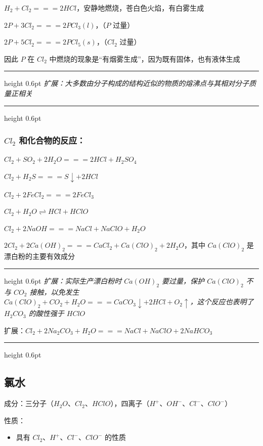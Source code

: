 \documentclass[UTF8,zihao=-4,openany]{ctexbook}
\newenvironment{notebox}
  {\par\smallskip\noindent\begingroup\begin{minipage}{\linewidth}\color{noteframe}\hrule height 0.6pt\smallskip\color{black}\itshape}
  {\par\smallskip\color{noteframe}\hrule height 0.6pt\end{minipage}\endgroup\par\smallskip}
\begin{document}
$H_2+Cl_2=\!=\!=2HCl$，安静地燃烧，苍白色火焰，有白雾生成\par

$2P+3Cl_2=\!=\!=2PCl_3(l)$，（$P$ 过量）\par

$2P+5Cl_2=\!=\!=2PCl_5(s)$，（$Cl_2$ 过量）\par

因此 $P$ 在 $Cl_2$ 中燃烧的现象是“有烟雾生成”，因为既有固体，也有液体生成\par
\begin{notebox}
扩展：大多数由分子构成的结构近似的物质的熔沸点与其相对分子质量正相关\par
\end{notebox}
\subsubsection{$Cl_2$ 和化合物的反应：}
$Cl_2+SO_2+2H_2O=\!=\!=2HCl+H_2SO_4$\par

$Cl_2+H_2S=\!=\!=S\downarrow+2HCl$\par

$Cl_2+2FeCl_2=\!=\!=2FeCl_3$\par

$Cl_2+H_2O\rightleftharpoons HCl+HClO$\par

$Cl_2+2NaOH=\!=\!=NaCl+NaClO+H_2O$\par

$2Cl_2+2Ca(OH)_2=\!=\!=CaCl_2+Ca(ClO)_2+2H_2O$，其中 $Ca(ClO)_2$ 是漂白粉的主要有效成分\par
\begin{notebox}
扩展：实际生产漂白粉时 $Ca(OH)_2$ 要过量，保护 $Ca(ClO)_2$ 不与 $CO_2$ 接触，以免发生 $Ca(ClO)_2+CO_2+H_2O=\!=\!=CaCO_3\downarrow +2HCl+O_2\uparrow$，这个反应也表明了 $H_2CO_3$ 的酸性强于 $HClO$\par
扩展：$Cl_2+2Na_2CO_3+H_2O=\!=\!=NaCl+NaClO+2NaHCO_3$\par
\end{notebox}
\subsection{氯水}
成分：三分子（$H_2O$、$Cl_2$、$HClO$），四离子（$H^+$、$OH^-$、$Cl^-$、$ClO^-$）\par

性质：\par
\begin{itemize}
\item 具有 $Cl_2$、$H^+$、$Cl^-$、$ClO^-$ 的性质
\end{itemize}
\end{document}
